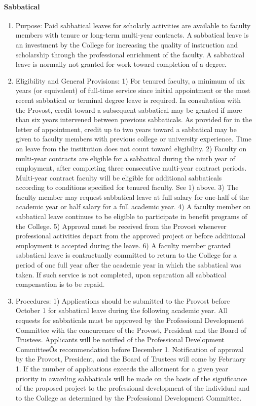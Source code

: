 \documentclass[letterpaper, 11pt]{article}
\begin{document}
			\paragraph{Sabbatical}
				\begin{enumerate}[label=\alph*)]
					\item{Purpose: Paid sabbatical leaves for scholarly activities are available to faculty members with tenure or long-term multi-year contracts.  A sabbatical leave is an investment by the College for increasing the quality of instruction and scholarship through the professional enrichment of the faculty.  A sabbatical leave is normally not granted for work toward completion of a degree.}
					\item{Eligibility and General Provisions:}
					1) For tenured faculty, a minimum of six years (or equivalent) of full-time service since initial appointment or the most recent sabbatical or terminal degree leave is required.  In consultation with the Provost, credit toward a subsequent sabbatical may be granted if more than six years intervened between previous sabbaticals.  As provided for in the letter of appointment, credit up to two years toward a sabbatical may be given to faculty members with previous college or university experience.  Time on leave from the institution does not count toward eligibility.
					2) Faculty on multi-year contracts are eligible for a sabbatical during the ninth year of employment, after completing three consecutive multi-year contract periods.  Multi-year contract faculty will be eligible for additional sabbaticals according to conditions specified for tenured faculty.  See 1) above.
					3) The faculty member may request sabbatical leave at full salary for one-half of the academic year or half salary for a full academic year.
					4) A faculty member on sabbatical leave continues to be eligible to participate in benefit programs of the College.
					5) Approval must be received from the Provost whenever professional activities depart from the approved project or before additional employment is accepted during the leave.
					6) A faculty member granted sabbatical leave is contractually committed to return to the College for a period of one full year after the academic year in which the sabbatical was taken.  If such service is not completed, upon separation all sabbatical compensation is to be repaid.
					\item{Procedures:}
					1) Applications should be submitted to the Provost before October 1 for sabbatical leave during the following academic year.  All requests for sabbaticals must be approved by the Professional Development Committee with the concurrence of the Provost, President and the Board of Trustees.  Applicants will be notified of the Professional Development CommitteeÕs recommendation before December 1.  Notification of approval by the Provost, President, and the Board of Trustees will come by February 1. If the number of applications exceeds the allotment for a given year priority in awarding sabbaticals will be made on the basis of the significance of the proposed project to the professional development of the individual and to the College as determined by the Professional Development Committee.

\end{enumerate}
\end{document}
